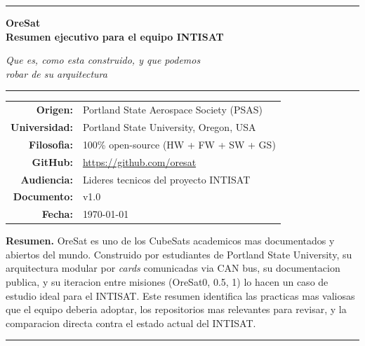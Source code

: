 \documentclass[11pt,a4paper,oneside]{report}
\begin{document}
\begin{titlepage}
\centering
\vspace*{1cm}
{\color{intisat}\rule{\textwidth}{2pt}}
\vspace{0.6cm}

{\Huge\bfseries\color{intisat} OreSat}\\[0.4em]
{\LARGE\bfseries Resumen ejecutivo para el equipo INTISAT}

\vspace{0.7cm}
{\Large\itshape Que es, como esta construido, y que podemos\\
robar de su arquitectura}

\vspace{1cm}
{\color{intisataccent}\rule{0.6\textwidth}{1pt}}

\vspace{2cm}

\begin{tabular}{rl}
\textbf{Origen:} & Portland State Aerospace Society (PSAS) \\
\textbf{Universidad:} & Portland State University, Oregon, USA \\
\textbf{Filosofia:} & 100\% open-source (HW + FW + SW + GS) \\
\textbf{GitHub:} & \url{https://github.com/oresat} \\
\textbf{Audiencia:} & Lideres tecnicos del proyecto INTISAT \\
\textbf{Documento:} & v1.0 \\
\textbf{Fecha:} & \today
\end{tabular}

\vfill

\begin{minipage}{0.85\textwidth}
\textbf{Resumen.}\quad
OreSat es uno de los CubeSats academicos mas documentados y abiertos
del mundo. Construido por estudiantes de Portland State University, su
arquitectura modular por \emph{cards} comunicadas via CAN bus, su
documentacion publica, y su iteracion entre misiones (OreSat0, 0.5, 1)
lo hacen un caso de estudio ideal para el INTISAT. Este resumen identifica
las practicas mas valiosas que el equipo deberia adoptar, los repositorios
mas relevantes para revisar, y la comparacion directa contra el estado
actual del INTISAT.
\end{minipage}

\vspace{1.2cm}
{\color{intisat}\rule{\textwidth}{2pt}}
\end{titlepage}
\end{document}
